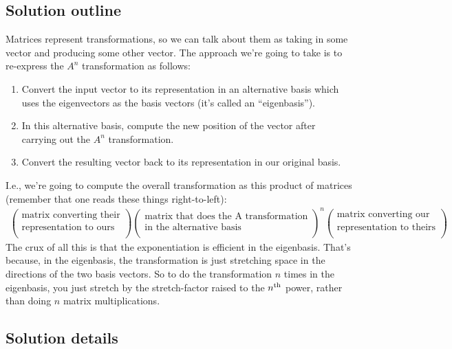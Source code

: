 \subsection*{Solution outline}

Matrices represent transformations, so we can talk about them as taking in some
vector and producing some other vector. The approach we're going to take is to
re-express the $A^n$ transformation as follows:

\begin{enumerate}
\item Convert the input vector to its representation in an alternative basis which uses the
  eigenvectors as the basis vectors (it's called an ``eigenbasis'').
\item In this alternative basis, compute the new position of the vector after carrying out the
  $A^n$ transformation.
\item Convert the resulting vector back to its representation in our original basis.
\end{enumerate}

I.e., we're going to compute the overall transformation as this product of
matrices (remember that one reads these things right-to-left):
\begin{align*}
  \begin{pmatrix}\text{matrix converting their}\\\text{representation to ours} \\ \end{pmatrix}
  \begin{pmatrix}\text{matrix that does the A transformation}\\\text{in the alternative basis} \\ \end{pmatrix}^n
  \begin{pmatrix}\text{matrix converting our}\\\text{representation to theirs} \\ \end{pmatrix}
\end{align*}
The crux of all this is that the exponentiation is efficient in the
eigenbasis. That's because, in the eigenbasis, the transformation is just
stretching space in the directions of the two basis vectors. So to do the
transformation $n$ times in the eigenbasis, you just stretch by the
stretch-factor raised to the $n^{\text{th}}$ power, rather than doing $n$ matrix
multiplications.

\subsection*{Solution details}

